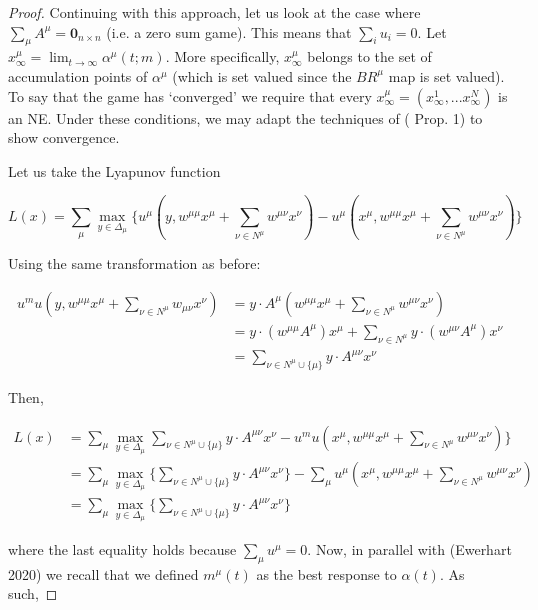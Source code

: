 \documentclass{article}
\theoremstyle{definition}
\newcommand{\wmunu}{w^{\mu \nu}}
\newcommand{\xmu}{x^{\mu}}
\newcommand{\xnu}{x^{\nu}}
\begin{document}
\begin{proof}
    Continuing with this approach, let us look at the case where $\sum_\mu A^\mu =
    \textbf{0}_{n\times n}$ (i.e. a zero sum game). This means that $\sum_i u_i = 0$. Let
    $\xmu_\infty = \lim_{t \rightarrow \infty} \alpha^\mu(t; m)$. More specifically, $\xmu_\infty$
    belongs to the set of accumulation points of $\alpha^\mu$ (which is set valued since
    the $BR^\mu$ map is set valued). To say that the game has `converged' we require that every
    $\xmu_\infty = (x^1_\infty, ... x^N_\infty)$ is an NE. Under these conditions, we may adapt the
    techniques of (\cite{Ewerhart} Prop. 1) to show convergence.
    
    
    Let us take the Lyapunov function
    
    \begin{equation}
      L(x) = \sum_\mu \max_{y \in \Delta_\mu} \{u^\mu(y, w^{\mu \mu} \xmu + \sum_{\nu \in N^\mu} \wmunu \xnu) - u^\mu(\xmu, w^{\mu \mu} \xmu + \sum_{\nu \in N^\mu} \wmunu \xnu) \}
    \end{equation}
    
    Using the same transformation as before:
    
    \begin{align}
       u^mu(y, w^{\mu \mu} \xmu + \sum_{\nu \in N^\mu} w_{\mu \nu} \xnu) & =  y \cdot A^\mu (w^{\mu \mu} \xmu + \sum_{\nu \in N^\mu} \wmunu \xnu) \nonumber \\
       & =  y \cdot (w^{\mu \mu} A^\mu) \xmu + \sum_{\nu \in N^\mu} y \cdot (\wmunu A^\mu) \xnu \nonumber \\
        & =  \sum_{\nu \in N^\mu \cup \{\mu\}} y \cdot A^{\mu \nu} \xnu \nonumber 
    \end{align}
    
    Then,
    
    \begin{align}
    L(x) &= \sum_\mu \max_{y \in \Delta_\mu}\sum_{\nu \in N^\mu \cup \{\mu\}} y \cdot A^{\mu \nu} \xnu  - u^mu(\xmu, w^{\mu \mu} \xmu + \sum_{\nu \in N^\mu} w^{\mu \nu} \xnu) \} \nonumber \\
    &= \sum_\mu \max_{y \in \Delta_\mu} \{\sum_{\nu \in N^\mu \cup \{\mu\}} y \cdot A^{\mu \nu} \xnu  \} - \sum_\mu  u^\mu(\xmu, w^{\mu \mu} \xmu + \sum_{\nu \in N^\mu} w^{\mu \nu} \xnu) \nonumber \\
    &= \sum_\mu \max_{y \in \Delta_\mu} \{\sum_{\nu \in N^\mu \cup \{\mu\}} y \cdot A^{\mu \nu} \xnu  \} \nonumber 
    \end{align}
    
    where the last equality holds because $\sum_\mu u^\mu = 0$. Now, in parallel with (Ewerhart 2020) we recall that we defined $m^\mu(t)$ as the best response to $\alpha(t)$. As such,


\end{proof}
\end{document}
